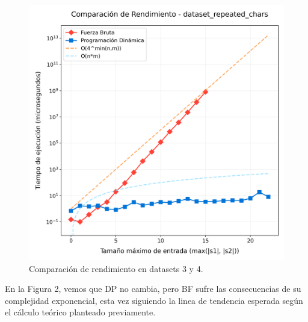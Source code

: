 \begin{figure}[H]
\begin{minipage}[t]{0.5\textwidth}
        \includegraphics[width=\textwidth]{images/comparacion_dataset_repeated_chars.png} \end{minipage}%
    \caption{Comparación de rendimiento en datasets 3 y 4.}
    \label{fig:dataset3_4}
\end{figure}

En la Figura 2, vemos que DP no cambia, pero BF sufre las consecuencias de su complejidad exponencial, esta vez siguiendo la linea de tendencia esperada según el cálculo 
teórico planteado previamente.

